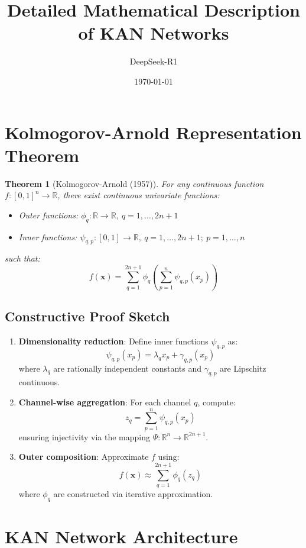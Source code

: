 \documentclass[12pt]{article}
\title{Detailed Mathematical Description of KAN Networks}
\author{DeepSeek-R1}
\date{\today}
\theoremstyle{plain}
\newtheorem{theorem}{Theorem}[section]
\theoremstyle{definition}
\begin{document}
\maketitle

\section{Kolmogorov-Arnold Representation Theorem}

\begin{theorem}[Kolmogorov-Arnold (1957)]
For any continuous function $ f: [0,1]^n \to \mathbb{R} $, there exist continuous univariate functions:
\begin{itemize}
    \item Outer functions: $ \phi_q: \mathbb{R} \to \mathbb{R},\ q = 1,\ldots,2n+1 $
    \item Inner functions: $ \psi_{q,p}: [0,1] \to \mathbb{R},\ q = 1,\ldots,2n+1;\ p = 1,\ldots,n $
\end{itemize}
such that:
\begin{equation}
    f(\mathbf{x}) = \sum_{q=1}^{2n+1} \phi_q \left( \sum_{p=1}^n \psi_{q,p}(x_p) \right)
    \label{eq:KArep}
\end{equation}
\end{theorem}

\subsection{Constructive Proof Sketch}
\begin{enumerate}
    \item \textbf{Dimensionality reduction}: Define inner functions $\psi_{q,p}$ as:
    $$
    \psi_{q,p}(x_p) = \lambda_q x_p + \gamma_{q,p}(x_p)
    $$
    where $\lambda_q$ are rationally independent constants and $\gamma_{q,p}$ are Lipschitz continuous.

    \item \textbf{Channel-wise aggregation}: For each channel $ q $, compute:
    $$
    z_q = \sum_{p=1}^n \psi_{q,p}(x_p)
    $$
    ensuring injectivity via the mapping $\Psi: \mathbb{R}^n \to \mathbb{R}^{2n+1}$.

    \item \textbf{Outer composition}: Approximate $ f $ using:
    $$
    f(\mathbf{x}) \approx \sum_{q=1}^{2n+1} \phi_q(z_q)
    $$
    where $\phi_q$ are constructed via iterative approximation.
\end{enumerate}

\section{KAN Network Architecture}
\end{document}
